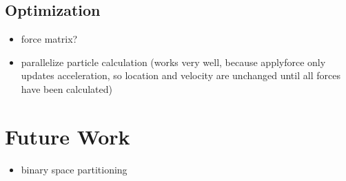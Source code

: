 \documentclass[runningheads,a4paper]{llncs}
\begin{document}
\subsection{Optimization}
\begin{itemize}
\item force matrix? 
\item parallelize particle calculation (works very well, because applyforce only updates acceleration, so location and velocity are unchanged until all forces have been calculated)
\end{itemize}

\section{Future Work}
\begin{itemize}
\item binary space partitioning
\end{itemize}





\end{document}

